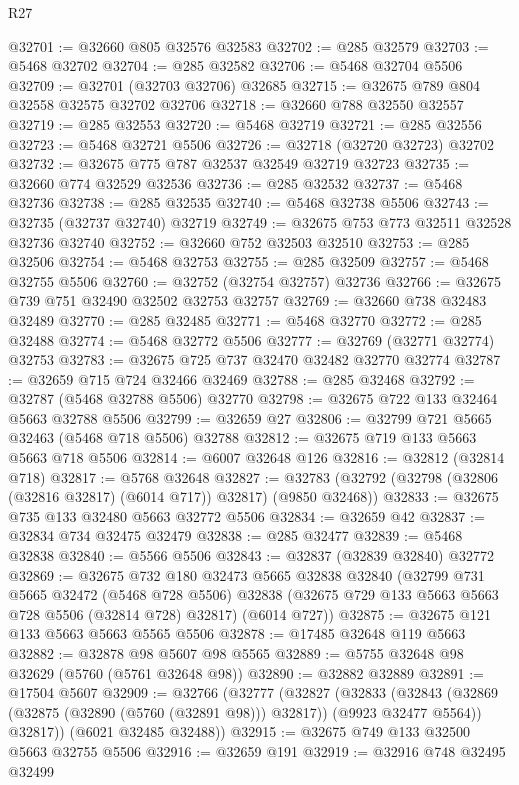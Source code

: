 \begin{lexlean}{R27}
\begin{coremodule}
@32701 := @32660 @805 @32576 @32583
@32702 := @285 @32579
@32703 := @5468 @32702
@32704 := @285 @32582
@32706 := @5468 @32704 @5506
@32709 := @32701 (@32703 @32706) @32685
@32715 := @32675 @789 @804 @32558 @32575 @32702 @32706
@32718 := @32660 @788 @32550 @32557
@32719 := @285 @32553
@32720 := @5468 @32719
@32721 := @285 @32556
@32723 := @5468 @32721 @5506
@32726 := @32718 (@32720 @32723) @32702
@32732 := @32675 @775 @787 @32537 @32549 @32719 @32723
@32735 := @32660 @774 @32529 @32536
@32736 := @285 @32532
@32737 := @5468 @32736
@32738 := @285 @32535
@32740 := @5468 @32738 @5506
@32743 := @32735 (@32737 @32740) @32719
@32749 := @32675 @753 @773 @32511 @32528 @32736 @32740
@32752 := @32660 @752 @32503 @32510
@32753 := @285 @32506
@32754 := @5468 @32753
@32755 := @285 @32509
@32757 := @5468 @32755 @5506
@32760 := @32752 (@32754 @32757) @32736
@32766 := @32675 @739 @751 @32490 @32502 @32753 @32757
@32769 := @32660 @738 @32483 @32489
@32770 := @285 @32485
@32771 := @5468 @32770
@32772 := @285 @32488
@32774 := @5468 @32772 @5506
@32777 := @32769 (@32771 @32774) @32753
@32783 := @32675 @725 @737 @32470 @32482 @32770 @32774
@32787 := @32659 @715 @724 @32466 @32469
@32788 := @285 @32468
@32792 := @32787 (@5468 @32788 @5506) @32770
@32798 := @32675 @722 @133 @32464 @5663 @32788 @5506
@32799 := @32659 @27
@32806 := @32799 @721 @5665 @32463 (@5468 @718 @5506) @32788
@32812 := @32675 @719 @133 @5663 @5663 @718 @5506
@32814 := @6007 @32648 @126
@32816 := @32812 (@32814 @718)
@32817 := @5768 @32648
@32827 := @32783 (@32792 (@32798 (@32806 (@32816 @32817) (@6014 @717)) @32817) (@9850 @32468))
@32833 := @32675 @735 @133 @32480 @5663 @32772 @5506
@32834 := @32659 @42
@32837 := @32834 @734 @32475 @32479
@32838 := @285 @32477
@32839 := @5468 @32838
@32840 := @5566 @5506
@32843 := @32837 (@32839 @32840) @32772
@32869 := @32675
    @732
    @180
    @32473
    @5665
    @32838
    @32840
    (@32799
      @731
      @5665
      @32472
      (@5468 @728 @5506)
      @32838
      (@32675 @729 @133 @5663 @5663 @728 @5506 (@32814 @728) @32817)
      (@6014 @727))
@32875 := @32675 @121 @133 @5663 @5663 @5565 @5506
@32878 := @17485 @32648 @119 @5663
@32882 := @32878 @98 @5607 @98 @5565
@32889 := @5755 @32648 @98 @32629 (@5760 (@5761 @32648 @98))
@32890 := @32882 @32889
@32891 := @17504 @5607
@32909 := @32766
    (@32777
      (@32827
        (@32833
          (@32843 (@32869 (@32875 (@32890 (@5760 (@32891 @98))) @32817)) (@9923 @32477 @5564))
          @32817))
      (@6021 @32485 @32488))
@32915 := @32675 @749 @133 @32500 @5663 @32755 @5506
@32916 := @32659 @191
@32919 := @32916 @748 @32495 @32499

\end{coremodule}
\end{lexlean}
